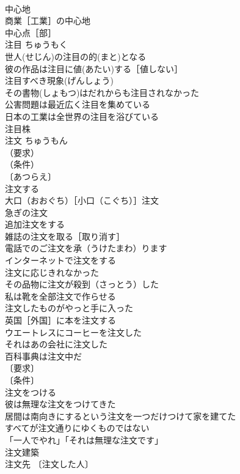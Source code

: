 \documentclass[8pt]{extreport}
\begin{document}
\begin{CJK}{UTF8}{min}
\\	中心地 
\\	商業［工業］の中心地 
\\	中心点［部］ 
\\	注目	ちゅうもく	
\\	世人(せじん)の注目の的(まと)となる 
\\	彼の作品は注目に値(あたい)する［値しない］ 
\\	注目すべき現象(げんしょう) 
\\	その書物(しょもつ)はだれからも注目されなかった 
\\	公害問題は最近広く注目を集めている 
\\	日本の工業は全世界の注目を浴びている 
\\	注目株 
\\	注文	ちゅうもん	
\\	（要求）
\\	（条件）
\\	〔あつらえ〕
\\	注文する 
\\	大口（おおぐち）［小口（こぐち）］注文 
\\	急ぎの注文 
\\	追加注文をする 
\\	雑誌の注文を取る［取り消す］ 
\\	電話でのご注文を承（うけたまわ）ります 
\\	インターネットで注文をする 
\\	注文に応じきれなかった 
\\	その品物に注文が殺到（さっとう）した 
\\	私は靴を全部注文で作らせる 
\\	注文したものがやっと手に入った 
\\	英国［外国］に本を注文する 
\\	ウエートレスにコーヒーを注文した 
\\	それはあの会社に注文した 
\\	百科事典は注文中だ 
\\	〔要求〕
\\	〔条件〕
\\	注文をつける 
\\	彼は無理な注文をつけてきた 
\\	居間は南向きにするという注文を一つだけつけて家を建てた 
\\	すべてが注文通りにゆくものではない 
\\	「一人でやれ」「それは無理な注文です」 
\\	注文建築 
\\	注文先 〔注文した人〕

\end{CJK}
\end{document}
